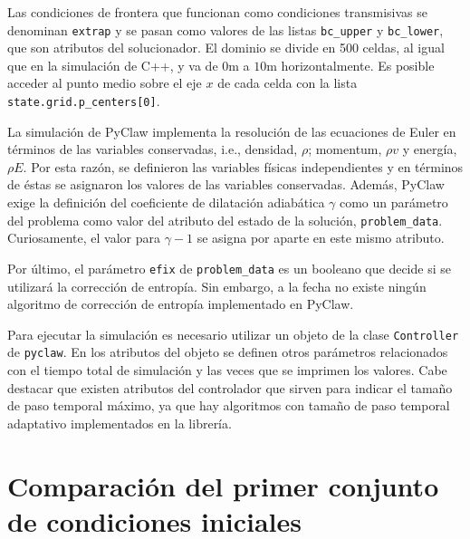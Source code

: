 
Las condiciones de frontera que funcionan como condiciones transmisivas se denominan \texttt{extrap} y se pasan como valores de las listas \texttt{bc\_upper} y \texttt{bc\_lower}, que son atributos del solucionador. El dominio se divide en 500 celdas, al igual que en la simulación de C++, y va de $0\unit{\m}$ a $10\unit{\m}$ horizontalmente. Es posible acceder al punto medio sobre el eje $x$ de cada celda con la lista \texttt{state.grid.p\_centers[0]}.


La simulación de PyClaw implementa la resolución de las ecuaciones de Euler en términos de las variables conservadas, i.e., densidad, $\rho$; momentum, $\rho v$ y energía, $\rho E$. Por esta razón, se definieron  las variables físicas independientes y en términos de éstas se asignaron los valores de las variables conservadas. Además, PyClaw exige la definición del coeficiente de dilatación adiabática $\gamma$ como un parámetro del problema como valor del atributo del estado de la solución, \texttt{problem\_data}. Curiosamente, el valor para $\gamma -1$ se asigna por aparte en este mismo atributo.

Por último, el parámetro \texttt{efix} de \texttt{problem\_data} es un booleano que decide si se utilizará la corrección de entropía. Sin embargo, a la fecha no existe ningún algoritmo de corrección de entropía implementado en PyClaw.


Para ejecutar la simulación es necesario utilizar un objeto de la clase \texttt{Controller} de \texttt{pyclaw}. En los atributos del objeto se definen otros parámetros relacionados con el tiempo total de simulación y las veces que se imprimen los valores. Cabe destacar que existen atributos del controlador que sirven para indicar el tamaño de paso temporal máximo, ya que hay algoritmos con tamaño de paso temporal adaptativo implementados en la librería.

\section{Comparación del primer conjunto de condiciones iniciales}
